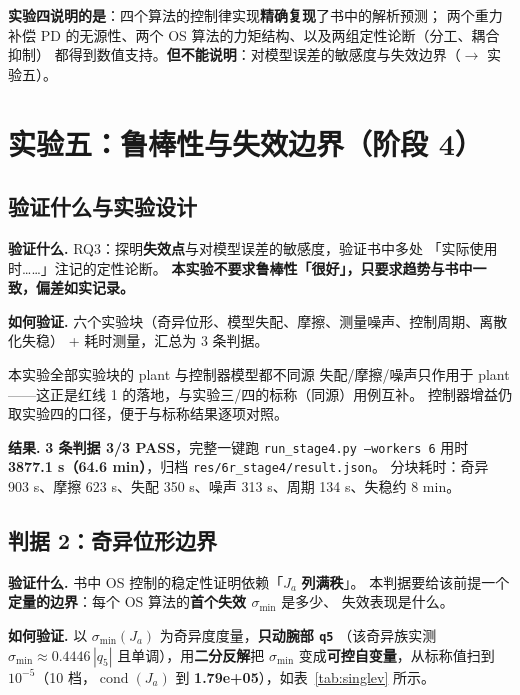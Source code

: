\documentclass[11pt,a4paper]{ctexart}
\begin{document}
\textbf{实验四说明的是}：四个算法的控制律实现\textbf{精确复现}了书中的解析预测；
两个重力补偿 PD 的无源性、两个 OS 算法的力矩结构、以及两组定性论断（分工、耦合抑制）
都得到数值支持。\textbf{但不能说明}：对模型误差的敏感度与失效边界（$\to$ 实验五）。

\section{实验五：鲁棒性与失效边界（阶段 4）}\label{sec:exp5}

\subsection{验证什么与实验设计}

\textbf{验证什么.} RQ3：探明\textbf{失效点}与对模型误差的敏感度，验证书中多处
「实际使用时……」注记的定性论断。
\textbf{本实验不要求鲁棒性「很好」，只要求趋势与书中一致，偏差如实记录。}

\textbf{如何验证.} 六个实验块（奇异位形、模型失配、摩擦、测量噪声、控制周期、离散化失稳）
+ 耗时测量，汇总为 3 条判据。

\begin{warnbox}{本实验全部实验块的 plant 与控制器模型都不同源}
失配/摩擦/噪声只作用于 plant——这正是红线 1 的落地，与实验三/四的标称（同源）用例互补。
控制器增益仍取实验四的口径，便于与标称结果逐项对照。
\end{warnbox}

\textbf{结果.} \textbf{3 条判据 3/3 PASS}，完整一键跑 \texttt{run\_stage4.py --workers 6} 用时
\textbf{3877.1 s（64.6 min）}，归档 \texttt{res/6r\_stage4/result.json}。
分块耗时：奇异 903 s、摩擦 623 s、失配 350 s、噪声 313 s、周期 134 s、失稳约 8 min。

\subsection{判据 2：奇异位形边界}\label{sec:singular}

\textbf{验证什么.} 书中 OS 控制的稳定性证明依赖「$J_a$ \textbf{列满秩}」。
本判据要给该前提一个\textbf{定量的边界}：每个 OS 算法的\textbf{首个失效 $\sigma_{\min}$} 是多少、
失效表现是什么。

\textbf{如何验证.} 以 $\sigma_{\min}(J_a)$ 为奇异度度量，\textbf{只动腕部 \texttt{q5}}
（该奇异族实测 $\sigma_{\min}\approx0.4446\,|q_5|$ 且单调），用\textbf{二分反解}把 $\sigma_{\min}$
变成\textbf{可控自变量}，从标称值扫到 $10^{-5}$（10 档，$\operatorname{cond}(J_a)$ 到
\textbf{1.79e+05}），如表~\ref{tab:singlev} 所示。
\end{document}
